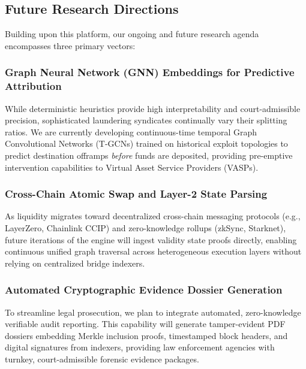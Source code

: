 \subsection{Future Research Directions}

Building upon this platform, our ongoing and future research agenda encompasses three primary vectors:

\subsubsection{Graph Neural Network (GNN) Embeddings for Predictive Attribution}
While deterministic heuristics provide high interpretability and court-admissible precision, sophisticated laundering syndicates continually vary their splitting ratios. We are currently developing continuous-time temporal Graph Convolutional Networks (T-GCNs) trained on historical exploit topologies to predict destination offramps \emph{before} funds are deposited, providing pre-emptive intervention capabilities to Virtual Asset Service Providers (VASPs).

\subsubsection{Cross-Chain Atomic Swap and Layer-2 State Parsing}
As liquidity migrates toward decentralized cross-chain messaging protocols (e.g., LayerZero, Chainlink CCIP) and zero-knowledge rollups (zkSync, Starknet), future iterations of the engine will ingest validity state proofs directly, enabling continuous unified graph traversal across heterogeneous execution layers without relying on centralized bridge indexers.

\subsubsection{Automated Cryptographic Evidence Dossier Generation}
To streamline legal prosecution, we plan to integrate automated, zero-knowledge verifiable audit reporting. This capability will generate tamper-evident PDF dossiers embedding Merkle inclusion proofs, timestamped block headers, and digital signatures from indexers, providing law enforcement agencies with turnkey, court-admissible forensic evidence packages.
